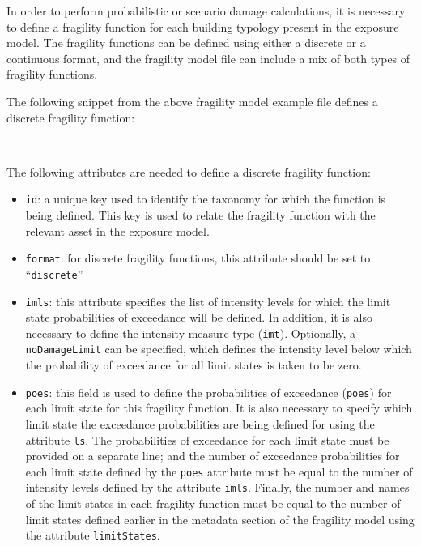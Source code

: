 In order to perform probabilistic or scenario damage calculations, it is
necessary to define a \gls{fragility function} for each building typology present in
the exposure model. The \glspl{fragility function} can be defined using either a
discrete or a continuous format, and the \gls{fragility model} file can include a
mix of both types of \glspl{fragility function}.

The following snippet from the above fragility model example file defines a
discrete fragility function:

\inputminted[firstline=11,firstnumber=11,lastline=17,fontsize=\footnotesize,frame=single,linenos,bgcolor=lightgray]{xml}{oqum/risk/Verbatim/input_fragility.xml}\\

The following attributes are needed to define a discrete fragility function:

\begin{itemize}

    \item \Verb+id+: a unique key used to identify the \gls{taxonomy} for 
    which the function is being defined. This key is used to relate the 
    \gls{fragility function} with the relevant \gls{asset} in the 
    \gls{exposure model}.

    \item \Verb+format+: for discrete fragility functions, this attribute 
    should be set to ``\Verb+discrete+''

    \item \Verb+imls+: this attribute specifies the list of intensity levels
    for which the limit state probabilities of exceedance will be defined. 
    In addition, it is also necessary to define the intensity measure type 
    (\Verb+imt+). Optionally, a \Verb+noDamageLimit+ can be specified, which 
    defines the intensity level below which the probability of exceedance 
    for all limit states is taken to be zero.

    \item \Verb+poes+: this field is used to define the probabilities of 
    exceedance (\Verb+poes+) for each limit state for this 
    \gls{fragility function}. It is also necessary to specify which limit 
    state the exceedance probabilities are being defined for using the 
    attribute \Verb+ls+. The probabilities of exceedance for each limit state
    must be provided on a separate line; and the number of exceedance 
    probabilities for each limit state defined by the \Verb+poes+ attribute 
    must be equal to the number of intensity levels defined by the attribute 
    \Verb+imls+. Finally, the number and names of the limit states in each 
    fragility function must be equal to the number of limit states defined 
    earlier in the metadata section of the \gls{fragility model} using the 
    attribute \Verb+limitStates+.

\end{itemize}



